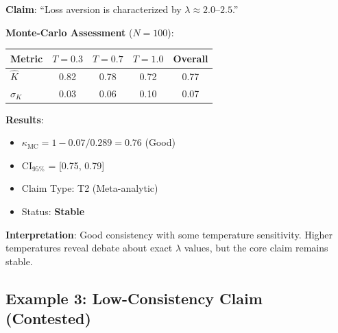 \documentclass[11pt,a4paper]{article}
\theoremstyle{remark}
\begin{document}
\begin{examplebox}[title={Loss Aversion Coefficient}]
\textbf{Claim}: ``Loss aversion is characterized by $\lambda \approx 2.0$--$2.5$.''

\textbf{Monte-Carlo Assessment} ($N = 100$):
\begin{center}
\begin{tabular}{lcccc}
\toprule
\textbf{Metric} & \textbf{$T=0.3$} & \textbf{$T=0.7$} & \textbf{$T=1.0$} & \textbf{Overall} \\
\midrule
$\hat{K}$ & 0.82 & 0.78 & 0.72 & 0.77 \\
$\sigma_K$ & 0.03 & 0.06 & 0.10 & 0.07 \\
\bottomrule
\end{tabular}
\end{center}

\textbf{Results}:
\begin{itemize}
    \item $\kappa_{\text{MC}} = 1 - 0.07/0.289 = 0.76$ (Good)
    \item CI$_{95\%}$ = [0.75, 0.79]
    \item Claim Type: T2 (Meta-analytic)
    \item Status: \textcolor{eslgreen}{\textbf{Stable}}
\end{itemize}

\textbf{Interpretation}: Good consistency with some temperature sensitivity. Higher temperatures reveal debate about exact $\lambda$ values, but the core claim remains stable.
\end{examplebox}

\subsection{Example 3: Low-Consistency Claim (Contested)}
\end{document}

